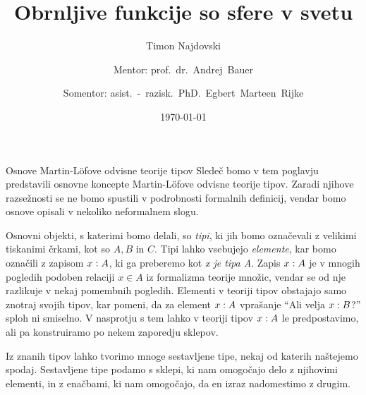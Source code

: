 \documentclass[a4paper, slovene]{article}
\title{Obrnljive funkcije so sfere v svetu}
\author{
  Timon Najdovski \and
  Mentor: prof.~dr.~Andrej~Bauer \and
  Somentor: asist.~-~razisk.~PhD.~Egbert~Marteen~Rijke
}
\date{\today}
\begin{document}
\maketitle

\begin{section}{Osnove Martin-Löfove odvisne teorije tipov}
  Sledeč \cite{rijke2022introduction} bomo v tem poglavju predstavili
  osnovne koncepte Martin-Löfove odvisne teorije tipov. Zaradi njihove razsežnosti se ne
  bomo spustili v podrobnosti formalnih definicij, vendar bomo osnove opisali v nekoliko
  neformalnem slogu.

  Osnovni objekti, s katerimi bomo delali, so \emph{tipi}, ki jih bomo označevali z
  velikimi tiskanimi črkami, kot so \(A, B\) in \(C\). Tipi lahko vsebujejo
  \emph{elemente}, kar bomo označili z zapisom \(x : A\), ki ga preberemo
  kot \emph{x je tipa A}. Zapis \(x : A\) je v mnogih pogledih
  podoben relaciji \(x \in A\) iz formalizma teorije množic, vendar se od nje razlikuje
  v nekaj pomembnih pogledih. Elementi v teoriji tipov obstajajo samo znotraj svojih
  tipov, kar pomeni, da za element \(x : A\) vprašanje
  ``Ali velja \(x : B\)?'' sploh ni smiselno. V nasprotju s tem
  lahko v teoriji tipov \(x : A\) le predpostavimo, ali pa
  konstruiramo po nekem zaporedju sklepov.

  Iz znanih tipov lahko tvorimo mnoge sestavljene tipe, nekaj od katerih naštejemo spodaj.
  Sestavljene tipe podamo s sklepi, ki nam omogočajo delo z njihovimi elementi, in
  z enačbami, ki nam omogočajo, da en izraz nadomestimo z drugim.


\end{section}
\end{document}
